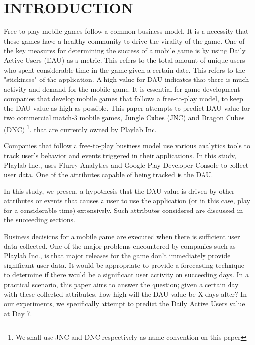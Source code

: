 %
%
%
\section{INTRODUCTION}
Free-to-play mobile games follow a common business model. It is a necessity that these games have a healthy community to drive the virality of the game. One of the key measures for determining the success of a mobile game is by using Daily Active Users (DAU) as a metric. This refers to the total amount of unique users who spent considerable time in the game given a certain date. This refers to the "stickiness" of the application. A high value for DAU indicates that there is much activity and demand for the mobile game. It is essential for game development companies that develop mobile games that follows a free-to-play model, to keep the DAU value as high as possible.  This paper attempts to predict DAU value for two commercial match-3 mobile games, Jungle Cubes (JNC) and Dragon Cubes (DNC) \footnote{We shall use JNC and DNC respectively as name convention on this paper}, that are currently owned by Playlab Inc.

Companies that follow a free-to-play business model use various analytics tools to track user's behavior and events triggered in their applications. In this study, Playlab Inc., uses Flurry Analytics and Google Play Developer Console to collect user data. One of the attributes capable of being tracked is the DAU.

In this study, we present a hypothesis that the DAU value is driven by other attributes or events that causes a user to use the application (or in this case, play for a considerable time) extensively. Such attributes considered are discussed in the succeeding sections.

Business decisions for a mobile game are executed when there is sufficient user data collected. One of the major problems encountered by companies such as Playlab Inc., is that major releases for the game don't immediately provide significant user data. It would be appropriate to provide a forecasting technique to determine if there would be a significant user activity on succeeding days. In a practical scenario, this paper aims to answer the question; given a certain day with these collected attributes, how high will the DAU value be X days after? In our experiments, we specifically attempt to predict the Daily Active Users value at Day 7.

